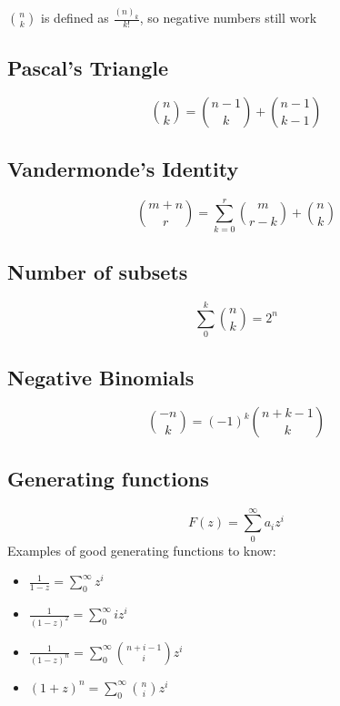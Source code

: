 \documentclass[twoside]{article}
\begin{document}
 ${n \choose k}$  is defined as $\frac{(n)_k}{k!}$, so negative numbers still work

\subsection{Pascal's Triangle}
\begin{equation}
{n \choose k} = {n-1 \choose k} + {n-1 \choose k-1} 
\end{equation}

\subsection{Vandermonde's Identity}
 \begin{equation}
{m + n \choose r} = \sum_{k=0}^r {m \choose r-k} + {n \choose k}
\end{equation}

\subsection{Number of subsets}
\begin{equation}
\sum_0^k {n \choose k} = 2^n
\end{equation}

\subsection{Negative Binomials}
\begin{equation}
{-n \choose k} = (-1)^k {n+k-1 \choose k} 
\end{equation}

\subsection{Generating functions}
\begin{equation}
    F(z) = \sum_0^{\infty}  a_iz^i
\end{equation}
Examples of good generating functions to know:
\begin{itemize}
    \item $\frac{1}{1-z} = \sum_0^{\infty} z^i$
    \item $\frac{1}{(1-z)^2} = \sum_0^{\infty} iz^i$
    \item $\frac{1}{(1-z)^n} = \sum_0^{\infty} {n+i-1 \choose i}  z^i$
    \item $(1+z)^n = \sum_0^{\infty} {n \choose i} z^i$
\end{itemize}
\end{document}
